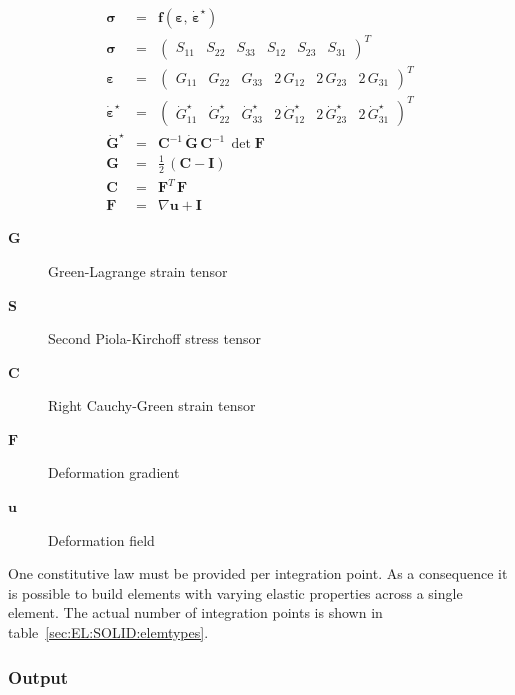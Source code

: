 \begin{eqnarray}
  \label{sec:EL:SOLID:constlaw}
  \boldsymbol{\sigma} & = & \boldsymbol{f}\left(\boldsymbol{\varepsilon},\, \dot{\boldsymbol{\varepsilon}}^{\star}\right) \\
  \boldsymbol{\sigma} & = & \begin{pmatrix} S_{11} & S_{22} & S_{33} & S_{12} & S_{23} & S_{31} \end{pmatrix}^T \\
  \boldsymbol{\varepsilon} & = & \begin{pmatrix} G_{11} & G_{22} & G_{33} & 2\,G_{12} & 2\,G_{23} & 2\,G_{31} \end{pmatrix}^T \\
  \dot{\boldsymbol{\varepsilon}}^{\star} & = & \begin{pmatrix} \dot{G}_{11}^{\star} & \dot{G}_{22}^{\star} & \dot{G}_{33}^{\star} & 2\,\dot{G}_{12}^{\star} & 2\,\dot{G}_{23}^{\star} & 2\,\dot{G}_{31}^{\star} \end{pmatrix}^T \\
  \dot{\boldsymbol{G}}^{\star} & = & \boldsymbol{C}^{-1} \, \dot{\boldsymbol{G}} \, \boldsymbol{C}^{-1} \, \det{\boldsymbol{F}} \\
  \boldsymbol{G} & = & \frac{1}{2}\,\left(\boldsymbol{C} - \boldsymbol{I}\right) \\
  \boldsymbol{C} & = & \boldsymbol{F}^T\,\boldsymbol{F} \\
  \boldsymbol{F} & = & \nabla \boldsymbol{u} + \boldsymbol{I}
\end{eqnarray}
\begin{description}
\item[$\boldsymbol{G}$] Green-Lagrange strain tensor
\item[$\boldsymbol{S}$] Second Piola-Kirchoff stress tensor
\item[$\boldsymbol{C}$] Right Cauchy-Green strain tensor
\item[$\boldsymbol{F}$] Deformation gradient
\item[$\boldsymbol{u}$] Deformation field
\end{description}
One constitutive law must be provided per integration point.
As a consequence it is possible to build elements with varying elastic properties across a single element.
The actual number of integration points is shown in table~\ref{sec:EL:SOLID:elemtypes}.
\subsubsection{Output}

